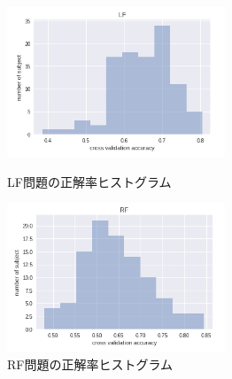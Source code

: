 \begin{figure}[t]
    \begin{minipage}{0.5\hsize}
     \begin{center}
      \includegraphics[width=65mm]{images/LF.png}
     \end{center}
     \caption{LF問題の正解率ヒストグラム}
     \label{fig:LFhist}
    \end{minipage}
    \begin{minipage}{0.5\hsize}
     \begin{center}
      \includegraphics[width=65mm]{images/RF.png}
     \end{center}
     \caption{RF問題の正解率ヒストグラム}
     \label{fig:RFhist}
    \end{minipage}
\end{figure}

